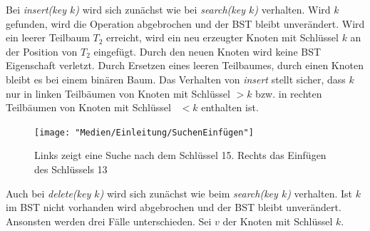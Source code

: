 \documentclass[a4paper,12pt]{article}
\begin{document}
Bei \textit{insert(key $k$)} wird sich zunächst wie bei  \textit{search(key $k$)} verhalten. Wird $k$ gefunden, wird die Operation abgebrochen und der BST bleibt unverändert. Wird ein leerer Teilbaum $T_2$ erreicht, wird ein neu erzeugter Knoten mit Schlüssel $k$ an der Position von $T_2$ eingefügt. Durch den neuen Knoten wird keine BST Eigenschaft verletzt. Durch Ersetzen eines leeren Teilbaumes, durch einen Knoten bleibt es bei einem binären Baum. Das Verhalten von  \textit{insert} stellt sicher, dass $k$ nur in linken Teilbäumen von Knoten mit Schlüssel $> k$ bzw. in rechten Teilbäumen von Knoten mit Schlüssel~ $< k$ enthalten ist.    \\
\begin{figure}[H]
	\centering
	\texttt{[image: "Medien/Einleitung/SuchenEinfügen"]}
	\caption{Links zeigt eine Suche nach dem Schlüssel 15. Rechts das Einfügen des Schlüssels 13}
	\label{fig:SuchenEinfügen}
\end{figure}
\noindent Auch bei \textit{delete(key $k$)} wird sich zunächst wie beim  \textit{search(key $k$)} verhalten. Ist $k$ im BST nicht vorhanden wird abgebrochen und der BST bleibt unverändert. Ansonsten werden drei Fälle unterschieden.
Sei $v$ der Knoten mit Schlüssel $k$.
\end{document}
